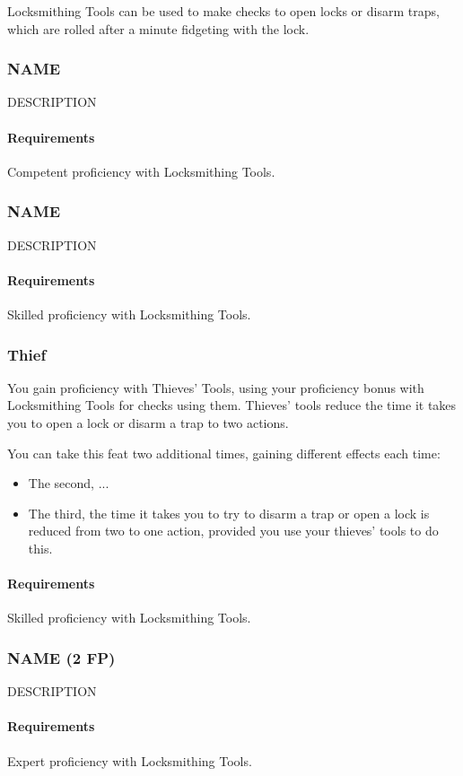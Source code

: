     Locksmithing Tools can be used to make checks to open locks or disarm traps, which are rolled after a minute fidgeting with the lock.
\subsubsection{NAME} \label{feat::name}
    DESCRIPTION
    \paragraph{Requirements} Competent proficiency with Locksmithing Tools.
\subsubsection{NAME} \label{feat::name}
    DESCRIPTION
    \paragraph{Requirements} Skilled proficiency with Locksmithing Tools.
\subsubsection{Thief} \label{feat::thief}
    You gain proficiency with Thieves' Tools, using your proficiency bonus with Locksmithing Tools for checks using them.
    Thieves' tools reduce the time it takes you to open a lock or disarm a trap to two actions.

    You can take this feat two additional times, gaining different effects each time:
    \begin{itemize}
        \item The second, ...
        \item The third, the time it takes you to try to disarm a trap or open a lock is reduced from two to one action, provided you use your thieves' tools to do this.
    \end{itemize}
    \paragraph{Requirements} Skilled proficiency with Locksmithing Tools.
\subsubsection{NAME (2 FP)} \label{feat::name}
    DESCRIPTION
    \paragraph{Requirements} Expert proficiency with Locksmithing Tools.
